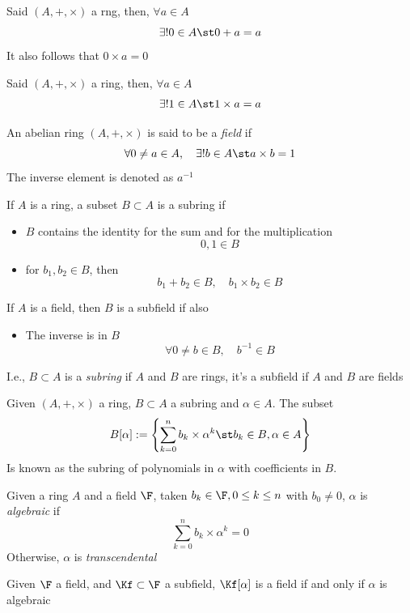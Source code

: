 \documentclass[../mmf.tex]{subfiles}
\begin{document}
\begin{thm}
	Said $(A, +, \times)$ a rng, then, $\forall a\in A$
	$$\exists!0\in A\st 0+a=a$$
	It also follows that $0\times a=0$
\end{thm}
\begin{thm}
	Said $(A, +, \times)$ a ring, then, $\forall a\in A$
	$$\exists!1\in A\st 1\times a=a$$
\end{thm}
\begin{dfn}[Field]
	An abelian ring $(A, +, \times)$ is said to be a \textit{field} if 
	$$\forall 0\ne a\in A, \quad\exists! b\in A\st a\times b=1$$
	The inverse element is denoted as $a^{-1}$
\end{dfn}
\begin{dfn}
	If $A$ is a ring, a subset $B\subset A$ is a subring if
	\begin{itemize}
	\item $B$ contains the identity for the sum and for the multiplication
		$$0, 1\in B$$
	\item for $b_1, b_2\in B$, then
		$$b_1+b_2\in B, \quad b_1\times b_2\in B$$
	\end{itemize}
	If $A$ is a field, then $B$ is a subfield if also
	\begin{itemize}
	\item The inverse is in $B$ $$\forall 0\ne b\in B, \quad b^{-1}\in B$$
	\end{itemize}
	I.e., $B\subset A$ is a \textit{subring} if $A$ and $B$ are rings, it's a subfield if $A$ and $B$ are fields
\end{dfn}
\begin{dfn}
	Given $(A, +, \times)$ a ring, $B\subset A$ a subring and $\alpha\in A$. The subset
	$$B[\alpha]:=\left\{ \sum_{k=0}^{n}b_k\times\alpha^k\st b_k\in B, \alpha\in A \right\}$$
	Is known as the subring of polynomials in $\alpha$ with coefficients in $B$.\\
\end{dfn}
\begin{dfn}
	Given a ring $A$ and a field $\F$, taken $b_k\in\F, 0\le k\le n$ with $b_0\ne 0$, $\alpha$ is \textit{algebraic} if
	$$\sum_{k=0}^{n}b_k\times\alpha^k=0$$
	Otherwise, $\alpha$ is \textit{transcendental}
\end{dfn}
\begin{thm}
	Given $\F$ a field, and $\Kf\subset\F$ a subfield, $\Kf[\alpha]$ is a field if and only if $\alpha$ is algebraic
\end{thm}
\end{document}
